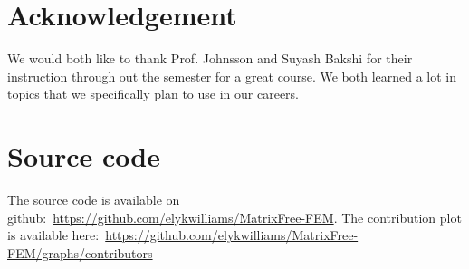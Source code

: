 \documentclass[12pt]{article}
\begin{document}
\section*{Acknowledgement}
We would both like to thank Prof. Johnsson and Suyash Bakshi for their instruction through out the semester for a great course. We both learned a lot in topics that we specifically plan to use in our careers. 

\section{Source code}\label{sec:source}

The source code is available on github:~\url{https://github.com/elykwilliams/MatrixFree-FEM}. The contribution plot is available here:~\url{https://github.com/elykwilliams/MatrixFree-FEM/graphs/contributors}







\end{document}
